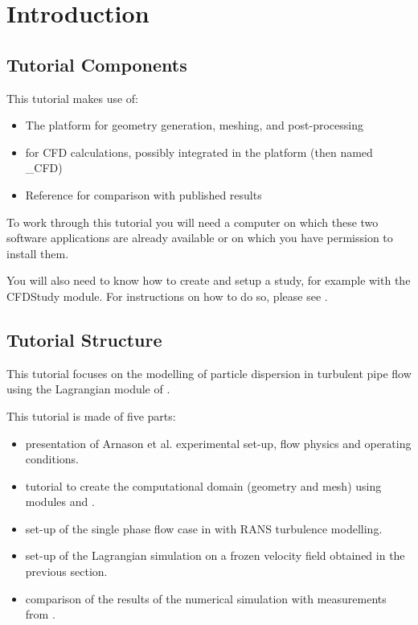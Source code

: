 \section{Introduction}

\subsection{Tutorial Components}

This tutorial makes use of:
\begin{itemize}
  \item The \salome \cite{Salome} platform for geometry generation, meshing, and post-processing
  \item \CS \cite{CS_Paper, CS_Web} for CFD calculations, possibly integrated in the \salome platform (then named \salome\_CFD)
  \item Reference \cite{Arnason} for comparison with published results
\end{itemize}
To work through this tutorial you will need a computer on which these two software applications are already available or on which you have permission to install them.

You will also need to know how to create and setup a \CS study, for example with the CFDStudy module. For instructions on how to do so, please see \cite{ShearDriven_Tuto}.

\subsection{Tutorial Structure}
This tutorial focuses on the modelling of particle dispersion in turbulent pipe flow using the Lagrangian module of \CS.

This tutorial is made of five parts:

\begin{itemize}

\item presentation of Arnason et al. experimental set-up, flow physics and operating conditions.

\item tutorial to create the computational domain (geometry and mesh) using \salome modules \geom and \smesh.

\item set-up of the single phase flow case in \CS with RANS turbulence modelling.
  
\item set-up of the Lagrangian simulation on a frozen velocity field obtained in the previous section.
  
\item comparison of the results of the numerical simulation with measurements from \cite{Arnason}.

\end{itemize}
